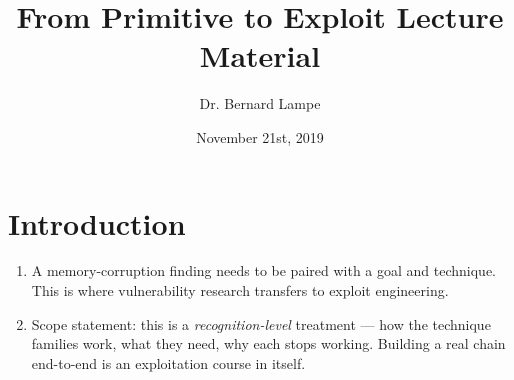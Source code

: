 \documentclass[12pt]{Training}
\title{From Primitive to Exploit Lecture Material}
\author{Dr. Bernard Lampe}
\date{November 21st, 2019}
\begin{document}
\maketitle


\section*{Introduction}
\begin{enumerate}
    \item A memory-corruption finding needs to be paired with a goal and technique. This is where vulnerability research transfers to exploit engineering.
    \item Scope statement: this is a \emph{recognition-level} treatment --- how the technique families work, what they need, why each stops working. Building a real chain end-to-end is an exploitation course in itself.
\end{enumerate}
\end{document}
